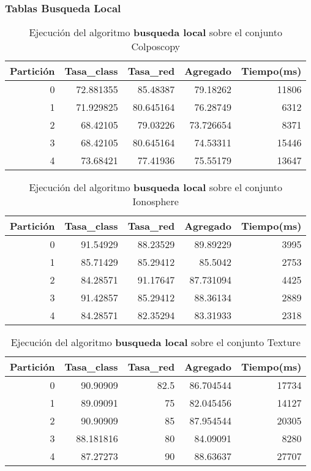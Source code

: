 \documentclass[size=a4, parskip=half, titlepage=false, toc=flat, toc=bib, 12pt]{scrartcl}
\begin{document}
\newpage

\subsubsection{Tablas Busqueda Local}

 \begin{table}[ht]
  \centering
  \begin{tabular}[t]{rrrrr}
  \toprule
  Partición &Tasa\_class &Tasa\_red & Agregado & Tiempo(ms)\\
  \midrule
0         & 72.881355 & 85.48387  & 79.18262  & 11806  \\
1         & 71.929825 & 80.645164 & 76.28749  & 6312   \\
2         & 68.42105  & 79.03226  & 73.726654 & 8371   \\
3         & 68.42105  & 80.645164 & 74.53311  & 15446  \\
4         & 73.68421  & 77.41936  & 75.55179  & 13647  \\
  \bottomrule
  \end{tabular}
  \caption{Ejecución del algoritmo \textbf{busqueda local} sobre el conjunto Colposcopy }
  \end{table}%

 \begin{table}[ht]
  \centering
  \begin{tabular}[t]{rrrrr}
  \toprule
  Partición &Tasa\_class &Tasa\_red & Agregado & Tiempo(ms)\\
  \midrule
0         & 91.54929  & 88.23529 & 89.89229  & 3995   \\
1         & 85.71429  & 85.29412 & 85.5042   & 2753   \\
2         & 84.28571  & 91.17647 & 87.731094 & 4425   \\
3         & 91.42857  & 85.29412 & 88.36134  & 2889   \\
4         & 84.28571  & 82.35294 & 83.31933  & 2318   \\
  \bottomrule
  \end{tabular}
  \caption{Ejecución del algoritmo \textbf{busqueda local} sobre el conjunto Ionosphere}
  \end{table}%

 \begin{table}[ht]
  \centering
  \begin{tabular}[t]{rrrrr}
  \toprule
  Partición &Tasa\_class &Tasa\_red & Agregado & Tiempo(ms)\\
  \midrule
0         & 90.90909  & 82.5     & 86.704544 & 17734  \\
1         & 89.09091  & 75       & 82.045456 & 14127  \\
2         & 90.90909  & 85       & 87.954544 & 20305  \\
3         & 88.181816 & 80       & 84.09091  & 8280   \\
4         & 87.27273  & 90       & 88.63637  & 27707  \\
\bottomrule
  \end{tabular}
  \caption{Ejecución del algoritmo \textbf{busqueda local} sobre el conjunto Texture}
  \end{table}%
\end{document}
